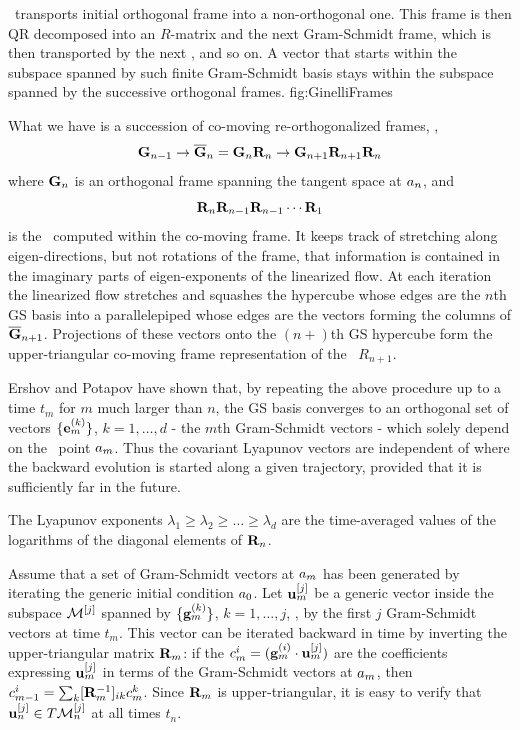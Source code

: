 %
 {}{ \JacobianM\ transports initial
orthogonal frame into a non-orthogonal one. This frame is then
QR decomposed into an $R$-matrix and the next Gram-Schmidt
frame, which is then transported by the next \jacobianM, and so
on. A vector that starts within the subspace spanned by such
finite Gram-Schmidt basis stays within the subspace spanned by
the successive orthogonal frames.
}{fig:GinelliFrames}
%

What we have is a succession of co-moving re-orthogonalized
frames, ,
\[
{\bf G}_{n-1} \to \overline{\bf G}_n =
 {\bf G}_n {\bf R}_n
 \to
{\bf G}_{n+1} {\bf R}_{n+1}{\bf R}_n
\]
where ${\bf G}_n$ is an orthogonal frame spanning the tangent
space at $a_n$, and
 \[
{\bf R}_n{\bf R}_{n-1} {\bf R}_{n-1}\cdots {\bf R}_1
 \]
 is the \jacobianM\ computed within the
co-moving frame. It keeps track of stretching along
eigen-directions, but not rotations of the frame, that
information is contained in the imaginary parts of
eigen-exponents of the linearized flow. At each iteration
the linearized flow stretches and squashes the hypercube
whose edges are the $n$th GS basis into a parallelepiped
whose edges are the vectors forming the columns of
$\overline{\bf G}_{n+1}$. Projections of these
vectors onto the $(n\!+\!)$th GS hypercube form
the upper-triangular co-moving frame representation
of the \jacobianM\ $R_{n+1}$.

Ershov and Potapov have shown that, by repeating
the above procedure up to a time $t_m$ for $m$ much larger than
$n$,  the GS basis converges to an orthogonal set of vectors
$\{{\bf e}_m^{(k)}\}$, $k=1,\ldots, d$ - the $m$th Gram-Schmidt
vectors - which solely depend on the \statesp\ point
$a_{m}$. Thus the covariant Lyapunov vectors are independent
of where the backward evolution is started along a given
trajectory, provided that it is sufficiently far in the future.

The Lyapunov exponents $\lambda_1 \geq \lambda_2 \geq \ldots
\geq \lambda_d$ are the time-averaged values of the logarithms
of the diagonal elements of ${\bf R}_n$.

Assume that a set of Gram-Schmidt vectors at $a_m$ has been
generated by iterating the generic initial condition $a_0$.
Let ${\bf u}_m^{[j]}$ be a generic vector inside the subspace
${\cal M}^{[j]}$ spanned by $\{{\bf g}_m^{(k)}\}$, $k=1,\ldots, j$,
\ie, by the first $j$ Gram-Schmidt vectors at time $t_m$. This
vector can be iterated backward in time by inverting the
upper-triangular matrix ${\bf R}_m$: if the $c_m^{i}=({\bf
g}_m^{(i)} \cdot {\bf u}_m^{[j]} )$ are the coefficients
expressing ${\bf u}_m^{[j]}$ in terms of the Gram-Schmidt
vectors at $a_m$, then $c_{m-1}^{i}= \sum_k [{\bf
R}_m^{-1}]_{ik} c_m^{k}$. Since ${\bf R}_m$ is
upper-triangular, it is easy to verify that ${\bf u}_n^{[j]}
\in T{\cal M}^{[j]}_n$ at all times $t_n$.


